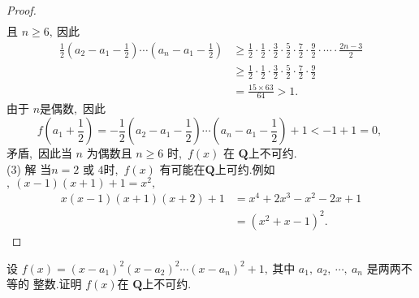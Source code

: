 \begin{proof}
$$\begin{array}{c}
	\end{array}$$
	且 $ n \geqslant 6 ,\  $因此
	$$\begin{aligned}
		\frac{1}{2}\left(a_{2}-a_{1}-\frac{1}{2}\right) \cdots\left(a_{n}-a_{1}-\frac{1}{2}\right) & \geqslant \frac{1}{2} \cdot \frac{1}{2} \cdot \frac{3}{2} \cdot \frac{5}{2} \cdot \frac{7}{2} \cdot \frac{9}{2} \cdot \cdots \cdot \frac{2 n-3}{2} \\
		& \geqslant \frac{1}{2} \cdot \frac{1}{2} \cdot \frac{3}{2} \cdot \frac{5}{2} \cdot \frac{7}{2} \cdot \frac{9}{2} \\
		& =\frac{15 \times 63}{64}>1 .
	\end{aligned}$$
	由于 $ n  $是偶数,\ 因此
	$$f\left(a_{1}+\frac{1}{2}\right)=-\frac{1}{2}\left(a_{2}-a_{1}-\frac{1}{2}\right) \cdots\left(a_{n}-a_{1}-\frac{1}{2}\right)+1<-1+1=0,\ $$
	矛盾,\  因此当  $n $ 为偶数且 $ n \geqslant 6 $ 时,\  $ f(x) $ 在 $ \mathbf{Q}  $上不可约.\\
	(3) 解 当$  n=2 $ 或 $4 $时,\  $ f(x) $ 有可能在$  \mathbf{Q}  $上可约.例如$,\   (x-1)(x+1)+1=x^{2} ,\ $
	$$\begin{aligned}
		x(x-1)(x+1)(x+2)+1&=x^{4}+2 x^{3}-x^{2}-2 x+1\\
		&=\left(x^{2}+x-1\right)^{2}.
	\end{aligned}$$
\end{proof}
\newpage
\begin{problem}
	设 $ f(x)=\left(x-a_{1}\right)^{2}\left(x-a_{2}\right)^{2} \cdots\left(x-a_{n}\right)^{2}+1 ,\  $其中 $ a_{1},\  a_{2},\  \cdots,\  a_{n}$  是两两不等的 整数.证明 $ f(x)  $在 $ \mathbf{Q}  $上不可约.
\end{problem}
